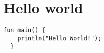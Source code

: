\chapter{Hello world}

\begin{example}
\begin{lstlisting}[language=intentio,mathescape=true]
  fun main() {
    println("Hello World!");
  }
\end{lstlisting}
\end{example}

